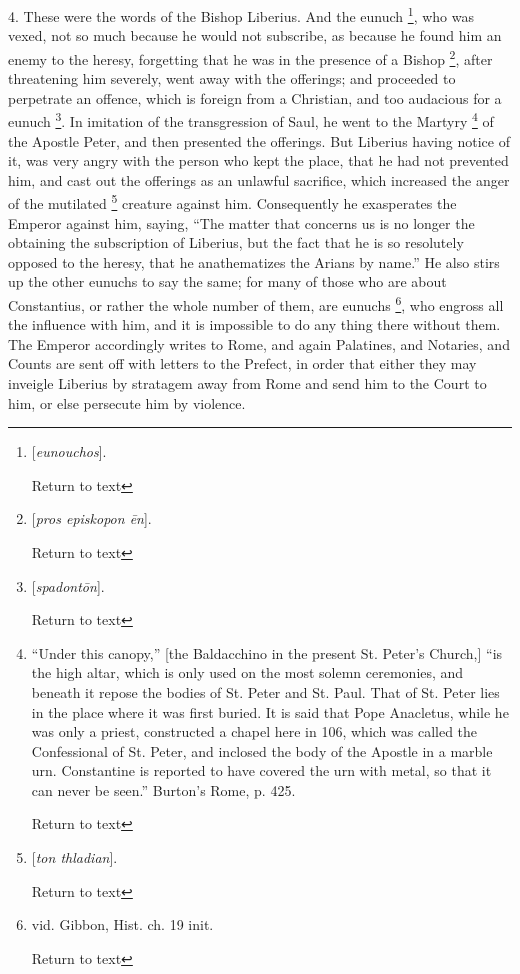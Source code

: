 4. These were the words of the Bishop Liberius.
And the eunuch \footnote{[\emph{eunouchos}].

Return to text}, who was vexed, not
so much because he would not subscribe, as because he found him an
enemy to the heresy, forgetting that he was in the presence of a
Bishop \footnote{[\emph{pros episkopon \={e}n}].

Return to text}, after threatening him
severely, went away with the offerings; and proceeded to perpetrate an
offence, which is foreign from a Christian, and too audacious for a
eunuch \footnote{[\emph{spadont\={o}n}].

Return to text}. In imitation of the
transgression of Saul, he went to the Martyry \footnote{``Under this canopy,'' [the Baldacchino in the present St. Peter's
Church,] ``is the high altar, which is only used on the most solemn
ceremonies, and beneath it repose the bodies of St. Peter and St.
Paul. That of St. Peter lies in the place where it was first buried.
It is said that Pope Anacletus, while he was only a priest,
constructed a chapel here in 106, which was called the Confessional of
St. Peter, and inclosed the body of the Apostle in a marble urn.
Constantine is reported to have covered the urn with metal, so that it
can never be seen.'' Burton's Rome, p. 425.

Return to text} of the Apostle Peter, and then presented the offerings. But
Liberius having notice of it, was very angry with the person who kept
the place, that he had not prevented him, and cast out the offerings
as an unlawful sacrifice, which increased the anger of the mutilated \footnote{[\emph{ton thladian}].

Return to text} creature against him. Consequently he exasperates the Emperor
against him, saying, ``The matter that concerns us is no longer the
obtaining the subscription of Liberius, but the fact that he is so
resolutely opposed to the heresy, that he anathematizes the Arians by
name.'' He also stirs up the other eunuchs to say the same; for many of
those who are about Constantius, or rather the whole number of them,
are eunuchs \footnote{vid. Gibbon, Hist. ch. 19 init.

Return to text}, who engross all
the influence with him, and it is impossible to do any thing there
without them. The Emperor accordingly writes to Rome, and again
Palatines, and Notaries, and Counts are sent off with letters to the
Prefect, in order that either they may inveigle Liberius by stratagem
away from Rome and send him to the Court to him, or else persecute him
by violence.

